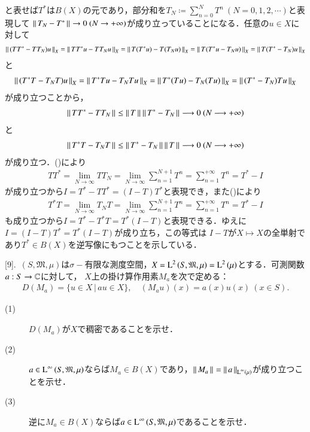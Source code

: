 \begin{prf}
\begin{description}
		と表せば$T^*$は$B(X)$の元であり，部分和を$T_N \coloneqq \sum_{n=0}^{N} T^n\ (N = 0,1,2,\cdots)$と表現して
		$\left\|\, T_N - T^*\, \right\|_{} \rightarrow 0\ (N \rightarrow +\infty)$が成り立っていることになる．任意の$u \in X$に対して
		\begin{align}
			\left\|\, (TT^* - TT_N)u\, \right\|_{X} = \left\|\, TT^*u - TT_Nu\, \right\|_{X} = \left\|\, T(T^*u) - T(T_Nu)\, \right\|_{X} = \left\|\, T(T^*u - T_Nu)\, \right\|_{X} = \left\|\, T(T^* - T_N)u\, \right\|_{X}
		\end{align}
		と
		\begin{align}
			\left\|\, (T^*T - T_NT)u\, \right\|_{X} = \left\|\, T^*Tu - T_NTu\, \right\|_{X} = \left\|\, T^*(Tu) - T_N(Tu)\, \right\|_{X} = \left\|\, (T^*-T_N)Tu\, \right\|_{X}
		\end{align}
		が成り立つことから，
		\begin{align}
			\left\|\, TT^* - TT_N\, \right\|_{} \leq \left\|\, T\, \right\|_{}\left\|\, T^* - T_N\, \right\|_{} \longrightarrow 0\ (N \longrightarrow +\infty) \label{eq:func_analy_conv1}
		\end{align}
		と
		\begin{align}
			\left\|\, T^*T - T_NT\, \right\|_{} \leq \left\|\, T^* - T_N\, \right\|_{}\left\|\, T\, \right\|_{} \longrightarrow 0\ (N \longrightarrow +\infty) \label{eq:func_analy_conv2}
		\end{align}
		が成り立つ．()により
		\begin{align}
			TT^* = \lim_{N \to \infty} TT_N = \lim_{N \to \infty} \sum_{n=1}^{N+1} T^n = \sum_{n=1}^{+\infty} T^n = T^* - I
		\end{align}
		が成り立つから$I = T^* - TT^* = (I - T)T^*$と表現でき，また()により
		\begin{align}
			T^*T = \lim_{N \to \infty} T_NT = \lim_{N \to \infty} \sum_{n=1}^{N+1} T^n = \sum_{n=1}^{+\infty} T^n = T^* - I
		\end{align}
		も成り立つから$I = T^* - T^*T = T^*(I - T)$と表現できる．ゆえに$I = (I - T)T^* = T^*(I - T)$が成り立ち，この等式は
		$I-T$が$X \longmapsto X$の全単射であり$T^* \in B(X)$を逆写像にもつことを示している．
		\QED
\end{description}
\end{prf}


[9].\ $(S, \mathfrak{M}, \mu)$は$\sigma-$有限な測度空間，$X=\operatorname{L}^{2} \left(S, \mathfrak{M}, \mu\right)=\operatorname{L}^{2} \left(\mu\right)$とする．可測関数$a:S \rightarrow \mathbb{C}$に対して，
$X$上の掛け算作用素$M_a$を次で定める：
\begin{align}
	D(M_a) = \{u \in X\, |\, au \in X\}, \quad (M_au)(x) = a(x)u(x)\ (x \in S).
\end{align}
\begin{description}
	\item[(1)] $D(M_a)$が$X$で稠密であることを示せ．
	\item[(2)] $a \in \operatorname{L}^{\infty} \left(S, \mathfrak{M}, \mu\right)$ならば$M_a \in B(X)$であり，$\left\|\, M_a\, \right\|_{} = \left\|\, a\, \right\|_{\operatorname{L}^{\infty} \left(\mu\right)}$が成り立つことを示せ．
	\item[(3)] 逆に$M_a \in B(X)$ならば$a \in \operatorname{L}^{\infty} \left(S, \mathfrak{M}, \mu\right)$であることを示せ．
\end{description}

